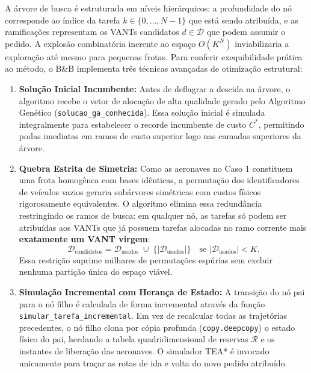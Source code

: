 A árvore de busca é estruturada em níveis hierárquicos: a profundidade do nó corresponde ao índice da tarefa $k \in \{0, \dots, N-1\}$ que está sendo atribuída, e as ramificações representam os VANTs candidatos $d \in \mathcal{D}$ que podem assumir o pedido. A explosão combinatória inerente ao espaço $O(K^N)$ inviabilizaria a exploração até mesmo para pequenas frotas. Para conferir exequibilidade prática ao método, o B\&B implementa três técnicas avançadas de otimização estrutural:
\begin{enumerate}
    \item \textbf{Solução Inicial Incumbente:} Antes de deflagrar a descida na árvore, o algoritmo recebe o vetor de alocação de alta qualidade gerado pelo Algoritmo Genético (\texttt{solucao\_ga\_conhecida}). Essa solução inicial é simulada integralmente para estabelecer o recorde incumbente de custo $C^*$, permitindo podas imediatas em ramos de custo superior logo nas camadas superiores da árvore.
    \item \textbf{Quebra Estrita de Simetria:} Como as aeronaves no Caso 1 constituem uma frota homogênea com bases idênticas, a permutação dos identificadores de veículos vazios geraria subárvores simétricas com custos físicos rigorosamente equivalentes. O algoritmo elimina essa redundância restringindo os ramos de busca: em qualquer nó, as tarefas só podem ser atribuídas aos VANTs que já possuem tarefas alocadas no ramo corrente mais \textbf{exatamente um VANT virgem}:
    \begin{equation}\label{eq:quebra_simetria}
    \mathcal{D}_{\text{candidatos}} = \mathcal{D}_{\text{usados}} \;\cup\; \big\{ |\mathcal{D}_{\text{usados}}| \big\} \quad \text{se } |\mathcal{D}_{\text{usados}}| < K.
    \end{equation}
    Essa restrição suprime milhares de permutações espúrias sem excluir nenhuma partição única do espaço viável.
    \item \textbf{Simulação Incremental com Herança de Estado:} A transição do nó pai para o nó filho é calculada de forma incremental através da função \texttt{simular\_tarefa\_incremental}. Em vez de recalcular todas as trajetórias precedentes, o nó filho clona por cópia profunda (\texttt{copy.deepcopy}) o estado físico do pai, herdando a tabela quadridimensional de reservas $\mathcal{R}$ e os instantes de liberação das aeronaves. O simulador TEA* é invocado unicamente para traçar as rotas de ida e volta do novo pedido atribuído.
\end{enumerate}

